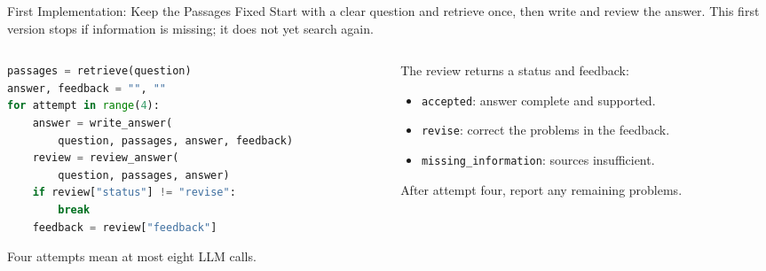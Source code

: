 \documentclass[aspectratio=169]{beamer}
\begin{document}
\begin{frame}[fragile]{First Implementation: Keep the Passages Fixed}
  \small Start with a clear question and retrieve once, then write and review the answer. This first version stops if information is missing; it does not yet search again.
  \par\vspace{0.4em}
  \begin{columns}[T,onlytextwidth]
    \begin{column}{0.63\linewidth}
\begin{lstlisting}[language=Python]
passages = retrieve(question)
answer, feedback = "", ""
for attempt in range(4):
    answer = write_answer(
        question, passages, answer, feedback)
    review = review_answer(
        question, passages, answer)
    if review["status"] != "revise":
        break
    feedback = review["feedback"]
\end{lstlisting}
      \small Four attempts mean at most eight LLM calls.
    \end{column}
    \begin{column}{0.34\linewidth}
      \small The review returns a status and feedback:
      \begin{itemize}
        \item \texttt{accepted}: answer complete and supported.
        \item \texttt{revise}: correct the problems in the feedback.
        \item \texttt{missing\_information}: sources insufficient.
      \end{itemize}
      After attempt four, report any remaining problems.
    \end{column}
  \end{columns}
\end{frame}
\end{document}
